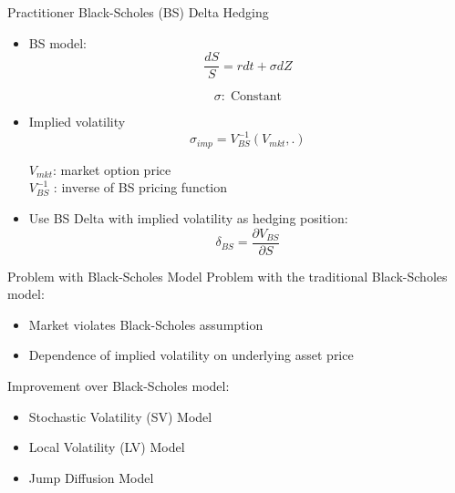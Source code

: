 \documentclass[10pt,table,mathserif]{beamer}
\begin{document}
\begin{frame}{Practitioner Black-Scholes (BS) Delta Hedging}
\begin{itemize}
  \item BS model:
\[
\frac{d S}{ S}= r dt +\sigma dZ
\]

\[
\sigma:\; \text{Constant}
\]
\item Implied volatility
  \[
  \sigma_{imp}=V_{BS}^{-1}(V_{mkt},.)
  \]
  \begin{center}
  $V_{mkt}$: market option price \\ $V_{BS}^{-1}$ : inverse of BS pricing function
  \end{center}

\item Use BS Delta with implied volatility as hedging position:
\[
\delta_{BS}=\frac{\partial V_{BS}}{ \partial S}
\]
\end{itemize}
\end{frame}






\begin{frame}{Problem with Black-Scholes Model}
Problem with the traditional Black-Scholes model:
\begin{itemize}
  \item Market violates Black-Scholes assumption
  \item Dependence of implied volatility on underlying asset price
\end{itemize}
Improvement over Black-Scholes model:
\begin{itemize}
  \item Stochastic Volatility (SV) Model
  \item Local Volatility (LV) Model
  \item Jump Diffusion Model
\end{itemize}

\end{frame}
\end{document}

